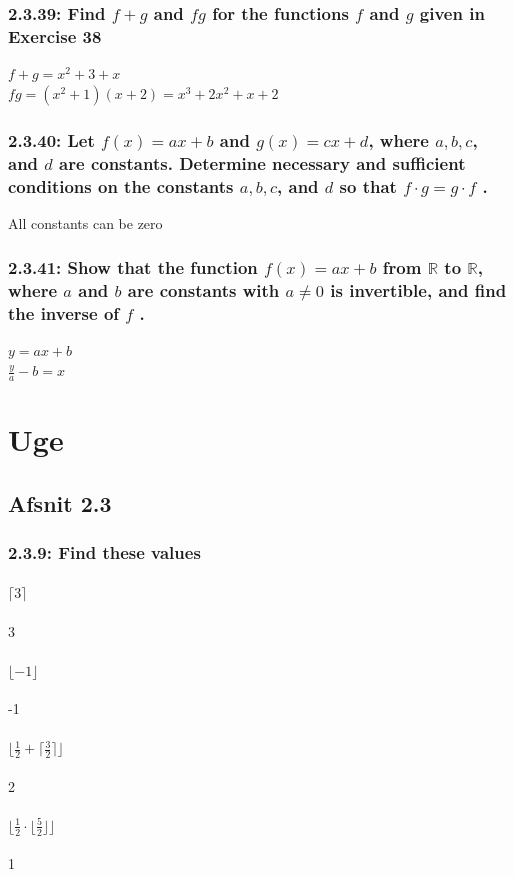 \documentclass[12pt, a4paper]{report}
\begin{document}
				\subsection{2.3.39: Find $f + g$ and $fg$ for the functions $f$ and $g$ given in Exercise 38}
					$f+g=x^2+3+x$\\
					$fg=(x^2+1)(x+2)=x^3+2x^2+x+2$	
				\subsection{2.3.40: Let $f(x) = ax + b$ and $g(x) = cx + d$, where $a, b, c$, and $d$ are constants. Determine necessary and sufficient conditions on the constants $a, b, c$, and $d$ so that $f\cdot g = g\cdot f$ .}
					All constants can be zero
				\subsection{2.3.41: Show that the function $f(x) = ax + b$ from $\mathbb{R}$ to $\mathbb{R}$, where $a$ and $b$ are constants with $a \neq 0$ is invertible, and find the inverse of $f$ .}
					$y=ax+b$\\
					$\frac{y}{a}-b=x$
		\chapter{Uge}
			\section{Afsnit 2.3}
				\setcounter{subsection}{8}
				\subsection{2.3.9: Find these values}
					\setcounter{subsubsection}{4}
					\subsubsection{$\lceil 3 \rceil$}
						3
					\subsubsection{$\lfloor -1 \rfloor$}
						-1
					\subsubsection{$\lfloor \frac{1}{2}+\lceil \frac{3}{2}\rceil\rfloor$}
						2
					\subsubsection{$\lfloor \frac{1}{2}\cdot \lfloor\frac{5}{2}\rfloor\rfloor$}
						1
				\setcounter{subsection}{11}
\end{document}
